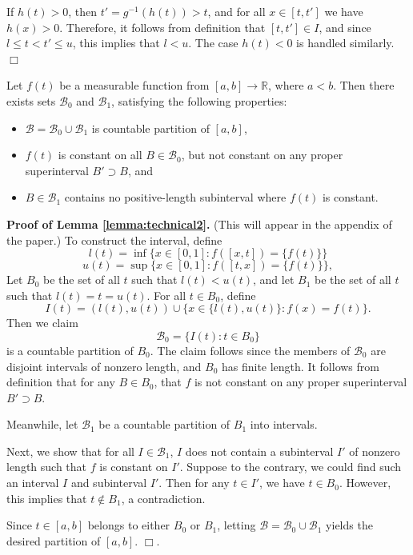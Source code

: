 \documentclass[12pt]{article}
\begin{document}
If $h(t) > 0$, then $t' = g^{-1}(h(t)) > t$, and for all $x \in [t,
t']$ we have $h(x) > 0$.  Therefore, it follows from definition that
$[t, t'] \in I$, and since $l \leq t < t' \leq u$, this implies that
$l < u$.  The case $h(t) < 0$ is handled similarly. $\Box$

\begin{lemma}\label{lemma:technical2}
Let $f(t)$ be a measurable function from $[a,b] \to \mathbb{R}$, where $a < b.$
Then there exists sets $\mathcal{B}_0$ and $\mathcal{B}_1$, satisfying the following properties:
\begin{itemize}
\item  $\mathcal{B} = \mathcal{B}_0 \cup \mathcal{B}_1$ is countable partition of $[a,b]$,
\item  $f(t)$ is constant on all $B \in \mathcal{B}_0$, but not constant on any proper superinterval $B' \supset B$, and
\item $B \in \mathcal{B}_1$ contains no positive-length subinterval where $f(t)$ is constant.
\end{itemize}
\end{lemma}

\textbf{Proof of Lemma \ref{lemma:technical2}.} (This will appear in the appendix of the paper.)
To construct the interval, define
\[
l(t) = \inf \{x \in [0,1]: f([x,t]) = \{f(t)\}\}
\]
\[
u(t) = \sup \{x \in [0,1]: f([t,x]) = \{f(t)\}\},
\]
Let $B_0$ be the set of all $t$ such that $l(t) < u(t)$,
and let $B_1$ be the set of all $t$ such that $l(t) = t = u(t)$.
For all $t \in B_0$, define
\[
I(t) = (l(t), u(t)) \cup \{x \in \{l(t), u(t)\}: f(x) = f(t)\}.
\]
Then we claim
\[
\mathcal{B}_0 = \{I(t): t \in B_0\}
\]
is a countable partition of $B_0$.  The claim follows since the
members of $\mathcal{B}_0$ are disjoint intervals of nonzero length,
and $B_0$ has finite length.    It follows from definition that for any $B \in B_0$, that $f$ is not
constant on any proper superinterval $B' \supset B$.

Meanwhile, let $\mathcal{B}_1$ be a countable partition of $B_1$ into
intervals.

Next, we show that for all $I \in \mathcal{B}_1$, $I$ does not contain
a subinterval $I'$ of nonzero length such that $f$ is constant on
$I'$.  Suppose to the contrary, we could find such an interval $I$ and
subinterval $I'$.  Then for any $t \in I'$, we have $t \in B_0$.
However, this implies that $t \notin B_1$, a contradiction.

Since $t \in [a,b]$ belongs to either $B_0$ or $B_1$,
letting $\mathcal{B} = \mathcal{B}_0 \cup \mathcal{B}_1$
yields the desired partition of $[a,b]$. $\Box$.
\end{document}
